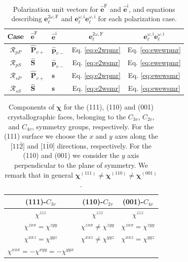 \begin{table}
\centering
\begin{tabular}{| c | l | l | c | c |}
\hline
Case               & $\hat{\mathbf{e}}^{\mathrm{F}}$
                   & $\hat{\mathbf{e}}^{\mathrm{i}}$
                   & $\mathbf{e}^{2\omega,\mathrm{F}}_{\ell}$
                   & $\mathbf{e}^{\omega,\mathrm{i}}_{\ell}
                      \mathbf{e}^{\omega,\mathrm{i}}_{\ell}$ \\
\hline
$\mathcal{R}_{pP}$ & $\hat{\mathbf{P}}_{v+}$
                   & $\hat{\mathbf{p}}_{v-}$
                   &  Eq. \eqref{eq:e2wpmr} & Eq. \eqref{eq:ewewpmr} \\
$\mathcal{R}_{pS}$ & $\hat{\mathbf{S}}$
                   & $\hat{\mathbf{p}}_{v-}$
                   &  Eq. \eqref{eq:e2wsmr} & Eq. \eqref{eq:ewewpmr} \\
$\mathcal{R}_{sP}$ & $\hat{\mathbf{P}}_{v+}$
                   & $\hat{\mathbf{s}}$
                   &  Eq. \eqref{eq:e2wpmr} & Eq. \eqref{eq:ewewsmr} \\
$\mathcal{R}_{sS}$ & $\hat{\mathbf{S}}$
                   & $\hat{\mathbf{s}}$
                   &  Eq. \eqref{eq:e2wsmr} & Eq. \eqref{eq:ewewsmr} \\
\hline
\end{tabular}
\caption{Polarization unit vectors for $\hat{\mathbf{e}}^{\mathrm{F}}$ and
$\hat{\mathbf{e}}^{\mathrm{i}}$, and equations describing
$\mathbf{e}^{2\omega,\mathrm{F}}_{\ell}$ and
$\mathbf{e}^{\omega,\mathrm{i}}_{\ell}\mathbf{e}^{\omega,\mathrm{i}}_{\ell}$ for
each polarization case.}
\label{tab:summary}
\end{table}

\begin{table}
\centering
\begin{tabular}{| c | c | c |}
\hline 
(111)-$C_{3v}$     & (110)-$C_{2v}$  & (001)-$C_{4v}$ \\
\hline 
$\chi^{zzz}$ & $\chi^{zzz}$ & $\chi^{zzz}$\\
$\chi^{zxx}=\chi^{zyy}$ & $\chi^{zxx}\ne\chi^{zyy}$ & $\chi^{zxx}=\chi^{zyy}$\\
$\chi^{xxz}=\chi^{yyz}$ & $\chi^{xxz}\ne\chi^{yyz}$ & $\chi^{xxz}=\chi^{yyz}$\\
$\chi^{xxx}=-\chi^{xyy}=-\chi^{yyx}$ & &  \\
\hline 
\end{tabular}
\caption{Components of $\boldsymbol{\chi}$ for the (111), (110) and (001)
crystallographic faces, belonging to the $C_{3v}$, $C_{2v}$, and $C_{4v}$,
symmetry groups, respectively. For the (111) surface we choose the $x$ and $y$
axes along the [$11\bar{2}$] and [$1\bar{1}0$] directions, respectively. For the
(110) and (001) we consider the $y$ axis perpendicular to the plane of
symmetry.\cite{sipePRB87} We remark that in general
$\boldsymbol{\chi}^{(111)}\ne \boldsymbol{\chi}^{(110)} \ne
\boldsymbol{\chi}^{(001)}$.}
\label{chis}
\end{table}

